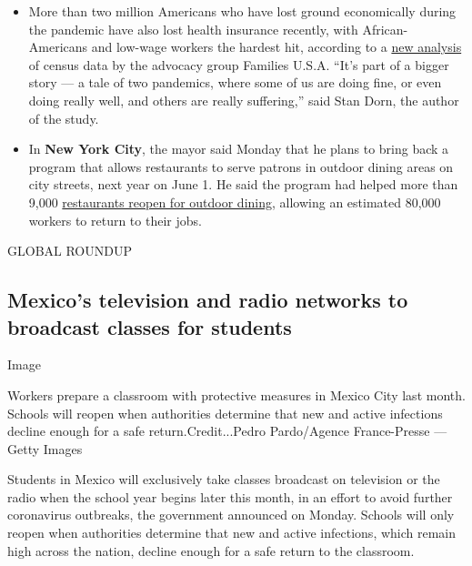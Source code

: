\begin{itemize}
\item
  More than two million Americans who have lost ground economically
  during the pandemic have also lost health insurance recently, with
  African-Americans and low-wage workers the hardest hit, according to a
  \href{https://familiesusa.org/resources/americas-coverage-crisis-deepens-new-survey-data-show-millions-of-adults-became-uninsured-starting-in-late-june/}{new
  analysis} of census data by the advocacy group Families U.S.A. ``It's
  part of a bigger story --- a tale of two pandemics, where some of us
  are doing fine, or even doing really well, and others are really
  suffering,'' said Stan Dorn, the author of the study.
\item
  In \textbf{New York City}, the mayor said Monday that he plans to
  bring back a program that allows restaurants to serve patrons in
  outdoor dining areas on city streets, next year on June 1. He said the
  program had helped more than 9,000
  \href{https://www.nytimes3xbfgragh.onion/2020/08/03/nyregion/nyc-small-businesses-closing-coronavirus.html}{restaurants
  reopen for outdoor dining}, allowing an estimated 80,000 workers to
  return to their jobs.
\end{itemize}

GLOBAL ROUNDUP

\hypertarget{mexicos-television-and-radio-networks-to-broadcast-classes-for-students-}{%
\subsection{Mexico's television and radio networks to broadcast classes
for students
}\label{mexicos-television-and-radio-networks-to-broadcast-classes-for-students-}}

Image

Workers prepare a classroom with protective measures in Mexico City last
month. Schools will reopen when authorities determine that new and
active infections decline enough for a safe return.Credit...Pedro
Pardo/Agence France-Presse --- Getty Images

Students in Mexico will exclusively take classes broadcast on television
or the radio when the school year begins later this month, in an effort
to avoid further coronavirus outbreaks, the government announced on
Monday. Schools will only reopen when authorities determine that new and
active infections, which remain high across the nation, decline enough
for a safe return to the classroom.

